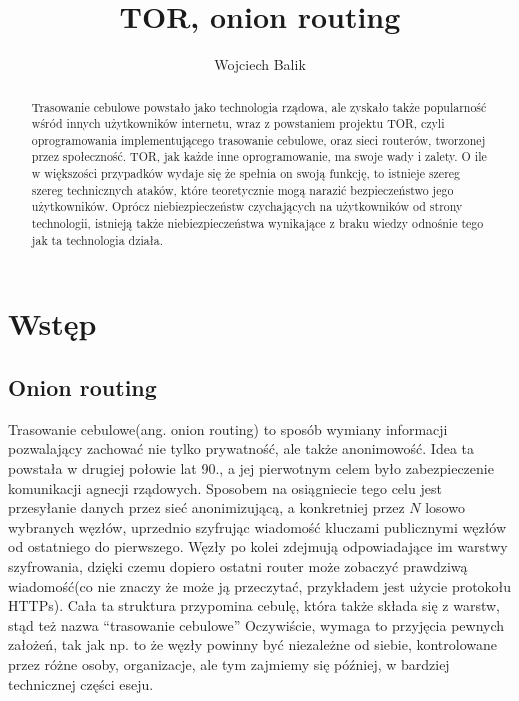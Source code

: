 \documentclass[polish]{kbk}
\begin{document}
\author{Wojciech Balik}
\title{TOR, onion routing}



\maketitle
\begin{abstract}
Trasowanie cebulowe powstało jako technologia rządowa, ale zyskało także popularność
wśród innych użytkowników internetu, wraz z powstaniem projektu TOR, czyli oprogramowania 
implementującego trasowanie cebulowe, oraz sieci routerów, tworzonej przez społeczność.
TOR, jak każde inne oprogramowanie, ma swoje wady i zalety. O ile w większości przypadków
wydaje się że spełnia on swoją funkcję, to istnieje szereg szereg technicznych ataków, 
które teoretycznie mogą narazić bezpieczeństwo jego użytkowników. Oprócz niebiezpieczeństw
czychających na użytkowników od strony technologii, istnieją także niebiezpieczeństwa
wynikające z braku wiedzy odnośnie tego jak ta technologia działa.
\end{abstract}

\section{Wstęp}
\subsection{Onion routing}
Trasowanie cebulowe(ang. onion routing) to sposób wymiany informacji pozwalający 
zachować nie tylko prywatność, ale także anonimowość. 
Idea ta powstała w drugiej połowie lat 90.\cite{onioncreation}, a jej pierwotnym 
celem było zabezpieczenie komunikacji agnecji rządowych. 
Sposobem na osiągniecie tego celu jest przesyłanie danych przez sieć anonimizującą, 
a konkretniej przez $N$ losowo wybranych węzłów, uprzednio szyfrując wiadomość 
kluczami publicznymi węzłów od ostatniego do pierwszego. 
Węzły po kolei zdejmują odpowiadające im warstwy szyfrowania, dzięki czemu dopiero 
ostatni router może zobaczyć prawdziwą wiadomość(co nie znaczy że może ją przeczytać, 
przykładem jest użycie protokołu HTTPs). Cała ta struktura przypomina cebulę, 
która także składa się z warstw, stąd też nazwa ``trasowanie cebulowe''
Oczywiście, wymaga to przyjęcia pewnych założeń, tak jak np. to że węzły powinny być niezależne od siebie, kontrolowane przez różne osoby, organizacje, ale tym zajmiemy 
się później, w bardziej technicznej części eseju.
\end{document}
